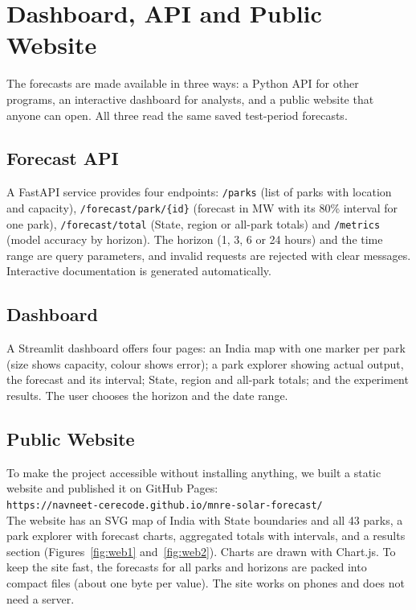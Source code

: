 \documentclass[12pt]{report}
\begin{document}
\chapter{Dashboard, API and Public Website}
The forecasts are made available in three ways: a Python API for other programs, an interactive dashboard for analysts, and a public website that anyone can open. All three read the same saved test-period forecasts.

\section{Forecast API}
\vspace{1mm}
A FastAPI service provides four endpoints: \texttt{/parks} (list of parks with location and capacity), \texttt{/forecast/park/\{id\}} (forecast in MW with its 80\% interval for one park), \texttt{/forecast/total} (State, region or all-park totals) and \texttt{/metrics} (model accuracy by horizon). The horizon (1, 3, 6 or 24 hours) and the time range are query parameters, and invalid requests are rejected with clear messages. Interactive documentation is generated automatically.

\section{Dashboard}
\vspace{1mm}
A Streamlit dashboard offers four pages: an India map with one marker per park (size shows capacity, colour shows error); a park explorer showing actual output, the forecast and its interval; State, region and all-park totals; and the experiment results. The user chooses the horizon and the date range.

\section{Public Website}
\vspace{1mm}
To make the project accessible without installing anything, we built a static website and published it on GitHub Pages:\\
\texttt{https://navneet-cerecode.github.io/mnre-solar-forecast/}\\

The website has an SVG map of India with State boundaries and all 43 parks, a park explorer with forecast charts, aggregated totals with intervals, and a results section (Figures~\ref{fig:web1} and~\ref{fig:web2}). Charts are drawn with Chart.js. To keep the site fast, the forecasts for all parks and horizons are packed into compact files (about one byte per value). The site works on phones and does not need a server.
\end{document}
